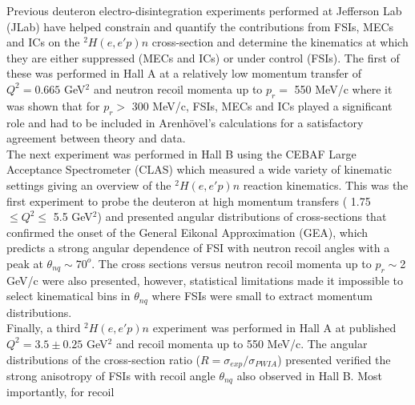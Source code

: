 \indent Previous deuteron electro-disintegration experiments performed at Jefferson Lab (JLab) have helped constrain and quantify the contributions from FSIs, MECs and ICs on
the $^{2}H(e,e'p)n$ cross-section and determine the kinematics at which they are either suppressed (MECs and ICs) or under control (FSIs). The first of these was performed in Hall A \cite{PhysRevLett.89.062301}
at a relatively low momentum transfer of $Q^{2}=0.665$ GeV$^{2}$ and neutron recoil momenta
up to $p_{r} = $ 550 MeV/c where it was shown that for $p_{r}>$ 300 MeV/c, FSIs, MECs and ICs played a significant role and had to be included in Arenh\"{o}vel's calculations \cite{PhysRevC.43.1022, PhysRevC.46.455, PhysRevC.52.1232, PhysRevC.55.2214}
for a satisfactory agreement between theory and data. \\
\indent The next experiment was performed in Hall B \cite{PhysRevLett.98.262502} using the CEBAF Large Acceptance Spectrometer (CLAS) which measured a wide variety of kinematic settings
giving an overview of the $^{2}H(e,e'p)n$ reaction kinematics. This was the first experiment to probe
the deuteron at high momentum transfers ( 1.75 $\leq Q^{2}\leq$ 5.5 GeV$^{2}$) and presented angular distributions of cross-sections that confirmed the onset of
the General Eikonal Approximation (GEA)\cite{sargsian_2001,PhysRevC.56.1124}, which predicts a strong angular dependence of FSI with neutron recoil angles with a peak at $\theta_{nq} \sim 70^{o}$.
The cross sections versus neutron recoil momenta up to $p_{r}\sim$2 GeV/c were also presented, however, statistical limitations made it impossible to select kinematical bins in $\theta_{nq}$ where
FSIs were small to extract momentum distributions.\\
\indent Finally, a third $^{2}H(e,e'p)n$ experiment was performed in Hall A \cite{PhysRevLett.107.262501} at published $Q^{2} = 3.5\pm0.25$ GeV$^{2}$ and recoil momenta up to 550 MeV/c. The angular distributions of
the cross-section ratio ($R = \sigma_{exp}/\sigma_{PWIA}$) presented verified the strong anisotropy of FSIs with recoil angle $\theta_{nq}$ also observed in Hall B\cite{PhysRevLett.98.262502}. Most importantly, for recoil
